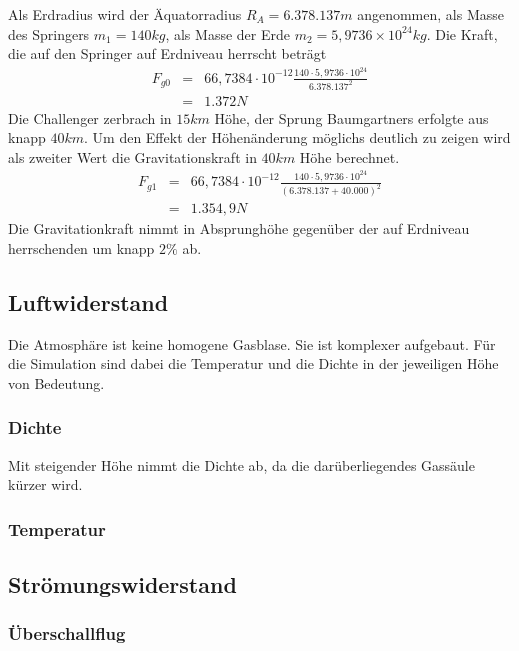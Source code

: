 Als Erdradius wird der Äquatorradius $R_A=6.378.137m$ angenommen, als Masse des Springers $m_1=140kg$, als Masse der Erde $m_2=5,9736\times 10^{24}kg$.
Die Kraft, die auf den Springer auf Erdniveau herrscht beträgt
\begin{eqnarray}
F_{g0} &=& 66,7384\cdot 10^{-12} \frac{140\cdot 5,9736\cdot 10^{24}}{6.378.137^2} \\
 &=& 1.372 N \nonumber
\end{eqnarray}
Die Challenger zerbrach in $15km$ Höhe, der Sprung Baumgartners erfolgte aus knapp $40km$.
Um den Effekt der Höhenänderung möglichs deutlich zu zeigen wird als zweiter Wert die Gravitationskraft in $40km$ Höhe berechnet.
\begin{eqnarray}
F_{g1} &=& 66,7384\cdot 10^{-12} \frac{140\cdot 5,9736\cdot 10^{24}}{\left(6.378.137 + 40.000\right)^2} \\
 &=& 1.354,9 N \nonumber
\end{eqnarray}
Die Gravitationkraft nimmt in Absprunghöhe gegenüber der auf Erdniveau herrschenden um knapp $2\%$ ab.

\subsection{Luftwiderstand}
Die Atmosphäre ist keine homogene Gasblase.
Sie ist komplexer aufgebaut.
Für die Simulation sind dabei die Temperatur und die Dichte in der jeweiligen Höhe von Bedeutung.

\subsubsection{Dichte}
Mit steigender Höhe nimmt die Dichte ab, da die darüberliegendes Gassäule kürzer wird.

\subsubsection{Temperatur}

\subsection{Strömungswiderstand}

\subsubsection{Überschallflug}
